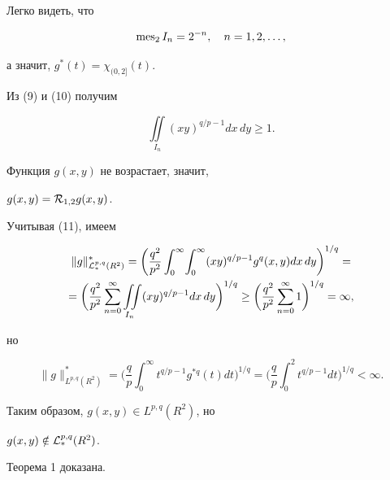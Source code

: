 Легко видеть, что


\begin{equation}


\mes_2 I_n = 2^{-n}, \quad n=1,2,\dotsc,


\end{equation}


а значит, $g^*(t) = \chi_{(0,2]}(t)$.


Из (9) и (10) получим


\begin{equation}


\iint\limits_{I_n}(xy)^{q/p-1}dx\,dy \ge 1.


\end{equation}





Функция $g(x,y)$ не возрастает, значит,


$g(x,y) = {\cal R}_{1,2}g(x,y)$.


Учитывая (11), имеем


\begin{multline*}


\|g\|_{{\cal L}_*^{p,q}(R^2)}^* =


\biggl(\frac{q^2}{p^2} \int_0^{\infty} \! \int_0^{\infty}


(xy)^{q/p-1} g^q(x,y)dx\,dy \biggr)^{1/q} = \\


= \biggl(\frac{q^2}{p^2} \sum_{n=0}^{\infty}


\iint\limits_{I_n}


(xy)^{q/p-1}dx\,dy\biggr)^{1/q} \ge


\biggl(\frac{q^2}{p^2}\sum_{n=0}^{\infty} 1 \biggr)^{1/q} = \infty,


\end{multline*}


но


$$


\|g\|_{L^{p,q}(R^2)}^* =


\biggl(\frac{q}{p} \int_0^{\infty}


t^{q/p-1} g^{*q}(t)dt \biggr)^{1/q} =


\biggl(\frac{q}{p} \int_0^2


t^{q/p-1}dt \biggr)^{1/q} < \infty.


$$


Таким образом, $g(x,y) \in L^{p,q}(R^2)$, но


$g(x,y) \notin {\cal L}_*^{p,q}(R^2)$.


Теорема 1 доказана.





